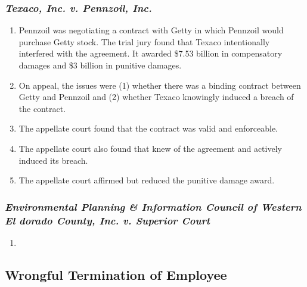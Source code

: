 \subsubsection{\emph{Texaco, Inc. v. Pennzoil, Inc.}}

\begin{enumerate}
    \item Pennzoil was negotiating a contract with Getty in which Pennzoil 
    would purchase Getty stock. The trial jury found that Texaco intentionally 
    interfered with the agreement. It awarded \$7.53 billion in compensatory 
    damages and \$3 billion in punitive damages.
    \item On appeal, the issues were (1) whether there was a binding contract 
    between Getty and Pennzoil and (2) whether Texaco knowingly induced a 
    breach of the contract.
    \item The appellate court found that the contract was valid and 
    enforceable.
    \item The appellate court also found that knew of the agreement and 
    actively induced its breach.
    \item The appellate court affirmed but reduced the punitive damage award.
\end{enumerate}

\subsubsection{\emph{Environmental Planning \& Information Council of Western 
El dorado County, Inc. v. Superior Court}}

\begin{enumerate}
    \item %
\end{enumerate}





\subsection{Wrongful Termination of Employee}

